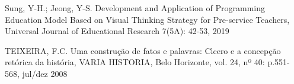 \documentclass[
12pt,		%
openright,	%
twoside,  %
a4paper,			%
chapter=TITLE,		%
english,			%
french,				%
spanish,			%
brazil				%
]{USPSC-classe/USPSC}
\begin{document}
\begin{flushleft}
\begin{flushleft}
\begin{flushleft}
\begin{flushleft}
\begin{flushleft}
\begin{flushleft}
\begin{flushleft}
\begin{flushleft}
\begin{flushleft}
[SUNG, 2019] Sung, Y-H.; Jeong, Y-S. Development and Application of Programming Education Model Based on Visual Thinking Strategy for Pre-service Teachers, Universal Journal of Educational Research 7(5A): 42-53, 2019
\end{flushleft}


\end{flushleft}


\end{flushleft}


\end{flushleft}


\end{flushleft}


\end{flushleft}


\end{flushleft}


\end{flushleft}


\end{flushleft}


\begin{flushleft}
\begin{flushleft}
\begin{flushleft}
\begin{flushleft}
\begin{flushleft}
\begin{flushleft}
\begin{flushleft}
\begin{flushleft}
\begin{flushleft}
[TEIXEIRA, 2008] TEIXEIRA, F.C. Uma constru\c{c}\~ao de fatos e palavras: C\'{\i}cero e a concep\c{c}\~ao ret\'orica da hist\'oria, VARIA HISTORIA, Belo Horizonte, vol. 24, nº 40: p.551-568, jul/dez 2008
\end{flushleft}


\end{flushleft}


\end{flushleft}


\end{flushleft}


\end{flushleft}


\end{flushleft}


\end{flushleft}


\end{flushleft}


\end{flushleft}
\end{document}
